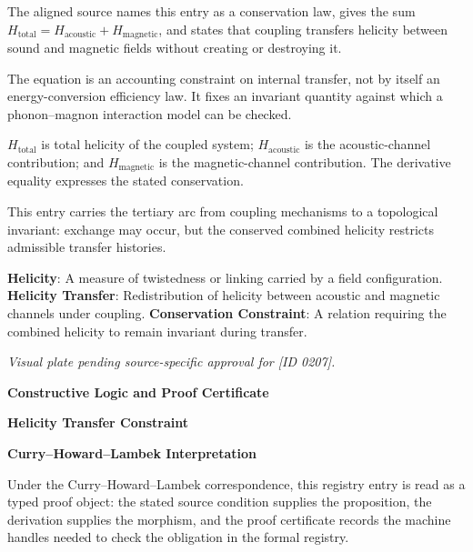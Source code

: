 
The aligned source names this entry as a conservation law, gives the sum \(H_{\mathrm{total}}=H_{\mathrm{acoustic}}+H_{\mathrm{magnetic}}\), and states that coupling transfers helicity between sound and magnetic fields without creating or destroying it.


The equation is an accounting constraint on internal transfer, not by itself an energy-conversion efficiency law. It fixes an invariant quantity against which a phonon--magnon interaction model can be checked.


\(H_{\mathrm{total}}\) is total helicity of the coupled system; \(H_{\mathrm{acoustic}}\) is the acoustic-channel contribution; and \(H_{\mathrm{magnetic}}\) is the magnetic-channel contribution. The derivative equality expresses the stated conservation.


This entry carries the tertiary arc from coupling mechanisms to a topological invariant: exchange may occur, but the conserved combined helicity restricts admissible transfer histories.


\noindent \textbf{Helicity}: A measure of twistedness or linking carried by a field configuration. \enspace\textbullet\enspace \textbf{Helicity Transfer}: Redistribution of helicity between acoustic and magnetic channels under coupling. \enspace\textbullet\enspace \textbf{Conservation Constraint}: A relation requiring the combined helicity to remain invariant during transfer.\par

\endgroup

\begingroup\footnotesize\itshape
Visual plate pending source-specific approval for [ID 0207].
\par\endgroup

\clearpage
\begingroup\tzpsupportsetup
\noindent\textbf{\fontsize{10.8pt}{12.8pt}\selectfont [ID 0207] Constructive Logic and Proof Certificate}\par
\noindent\textbf{\fontsize{10pt}{12pt}\selectfont Helicity Transfer Constraint}\par
\vspace{0.45em}
\begingroup
\footnotesize
\setlength{\parskip}{0.22em}
\setlength{\parindent}{0pt}
\noindent\textbf{Curry--Howard--Lambek Interpretation}\par
Under the Curry--Howard--Lambek correspondence, this registry entry is read as a typed proof
object: the stated source condition supplies the proposition, the derivation supplies the
morphism, and the proof certificate records the machine handles needed to check the obligation
in the formal registry.

